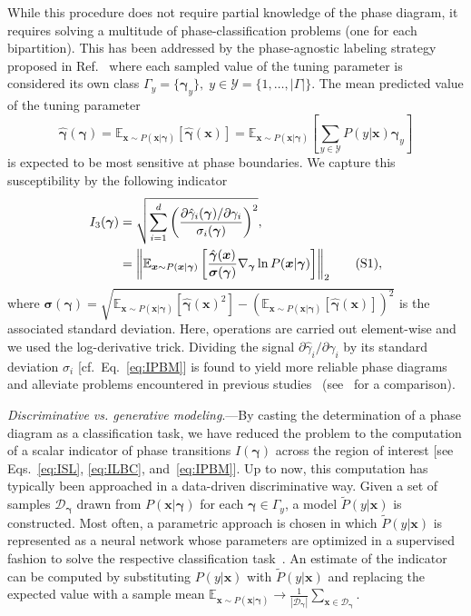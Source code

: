 \documentclass[twocolumn,aps,prl,superscriptaddress,tightlines,nofootinbib]{revtex4-2}
\newcommand\numberthis{\addtocounter{equation}{1}\tag{\theequation}}
\begin{document}
\indent While this procedure does not require partial knowledge of the phase diagram, it requires solving a multitude of phase-classification problems (one for each bipartition). This has been addressed by the phase-agnostic labeling strategy proposed in Ref.~\cite{schaefer:2019} where each sampled value of the tuning parameter is considered its own class $\Gamma_{y} = \{ \bm{\gamma}_{y}\}, \; y \in \mathcal{Y} = \{1,\dots,|\Gamma| \}$. The mean predicted value of the tuning parameter
\begin{equation}
    \hat{\bm{\gamma}}(\bm{\gamma}) = \mathbb{E}_{\bm{x} \sim P(\bm{x}|\bm{\gamma})}\left[ \hat{\bm{\gamma}}(\bm{x})\right] = \mathbb{E}_{\bm{x} \sim P(\bm{x}|\bm{\gamma})}\left[ \sum_{y \in \mathcal{Y}} P(y|\bm{x})\bm{\gamma}_{y}\right]
\end{equation}
is expected to be most sensitive at phase boundaries. We capture this susceptibility by the following indicator
\begin{align*}\label{eq:IPBM}
    I_{3}(\bm{\gamma}) &= \sqrt{\sum_{i=1}^{d} \left(\frac{\partial \hat{\gamma}_{i}(\bm{\gamma}) / \partial \gamma_{i} }{\sigma_{i}(\bm{\gamma})}\right)^2},\\
    &=  \norm{ \mathbb{E}_{\bm{x} \sim P(\bm{x}|\bm{\gamma})}\left[\frac{\hat{\bm{\gamma}}(\bm{x})}{\bm{\sigma}(\bm{\gamma})} \nabla_{\bm{\gamma}} \ln P(\bm{x}|\bm{\gamma}) \right]}_{2} \numberthis,
\end{align*}
where $\bm{\sigma}(\bm{\gamma}) = \sqrt{\mathbb{E}_{\bm{x} \sim P(\bm{x}|\bm{\gamma})}\left[ \hat{\bm{\gamma}}(\bm{x})^2\right] - \left(\mathbb{E}_{\bm{x} \sim P(\bm{x}|\bm{\gamma})}\left[ \hat{\bm{\gamma}}(\bm{x})\right]\right)^2}$ is the associated standard deviation. Here, operations are carried out element-wise and we used the log-derivative trick. Dividing the signal $\partial \hat{\gamma}_{i}/\partial \gamma_{i}$ by its standard deviation $\sigma_{i}$ [cf.~Eq.~\eqref{eq:IPBM}] is found to yield more reliable phase diagrams and alleviate problems encountered in previous studies~\cite{schaefer:2019,arnold:2022} (see~\cite{suppl} for a comparison).

\indent \emph{Discriminative vs. generative modeling}.---By casting the determination of a phase diagram as a classification task, we have reduced the problem to the computation of a scalar indicator of phase transitions $I(\bm{\gamma})$ across the region of interest [see Eqs.~\eqref{eq:ISL}, \eqref{eq:ILBC}, and~\eqref{eq:IPBM}]. Up to now, this computation has typically been approached in a data-driven discriminative way. Given a set of samples $\mathcal{D}_{\bm{\gamma}}$ drawn from $P(\bm{x}|\bm{\gamma})$ for each $\bm{\gamma} \in \Gamma_{y}$, a model $\tilde{P}(y|\bm{x})$ is constructed. Most often, a parametric approach is chosen in which $\tilde{P}(y|\bm{x})$ is represented as a neural network whose parameters are optimized in a supervised fashion to solve the respective classification task~\cite{suppl}. An estimate of the indicator can be computed by substituting $P(y|\bm{x})$ with $\tilde{P}(y|\bm{x})$ and replacing the expected value with a sample mean $\mathbb{E}_{\bm{x} \sim P(\bm{x}|\bm{\gamma})} \rightarrow \frac{1}{|\mathcal{D}_{\bm{\gamma}}|}\sum_{\bm{x} \in \mathcal{D}_{\bm{\gamma}}}$.
\end{document}
